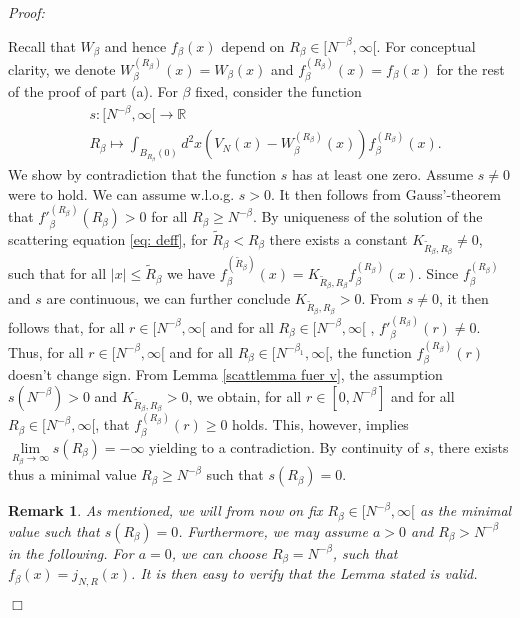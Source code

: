 \documentclass[11pt, english, american]{article}
\newtheorem{remark}[theorem]  {Remark}
\newenvironment{proof}{\emph{Proof:}}{\begin{flushright} $ \Box $ \end{flushright}}
\begin{document}
\begin{proof}
\begin{enumerate}
Recall that $W_{\beta}$ and hence $f_{\beta}(x) $ depend on $R_\beta
\in [N^{-\beta}, \infty[
$. 
 For conceptual clarity, we
 denote $W_{\beta}^{(R_{\beta})}(x) = W_{\beta}(x) $ and
$f_{\beta}^{(R_{\beta})}(x)= f_{\beta}(x)$ for the rest of the proof of part (a).
For $\beta$ fixed, consider the function
\begin{align}
& s: [N^{-\beta} ,\infty [ 
\rightarrow  \mathbb{R} \\
&R_{\beta}
\mapsto  
\int_{B_{R_{\beta}}(0)} d^2 x
 (V_N(x)-W^{(R_{\beta})}_{\beta}(x)) f^{(R_{\beta})}_{\beta} (x).
\end{align}
We show  by contradiction that the function $s$ has at least one zero.
Assume $s \neq 0$ were to hold.
 We can assume w.l.o.g. $s >0$. 
It  then
follows from Gauss'-theorem that 
$
f'^{(R_{\beta})}_{\beta}(R_{\beta})> 0
$ for all  
$R_\beta \geq N^{-\beta}$.
By uniqueness of the solution of the scattering equation \eqref{eq: deff}, for $\tilde{R}_{\beta}<R_{\beta}$ there exists a constant
$ K_{\tilde{R}_{\beta},R_{\beta}} \neq 0$, such that for all
$
|x|\leq \tilde{R}_{\beta}
$
we have
$
f^{(\tilde{R}_{\beta})}_{\beta}(x)= K_{\tilde{R}_{\beta},R_{{\beta}}}f^{(R_{\beta})}_{\beta}(x)
$. Since $ f^{(R_{\beta})}_{\beta} $ and $s$ are continuous, we can further conclude
 $ K_{\tilde{R}_{\beta},R_{{\beta}}}> 0$.
From $ s \neq 0$, it then follows that, for all $r \in [N^{-\beta} ,\infty [  $ and for all $R_\beta \in [N^{-\beta} ,\infty [ $ , $
f'^{(R_{\beta})}_{\beta}(r) \neq 0 $.
Thus, for all $r \in [N^{-\beta} ,\infty [  $ and for all $R_\beta \in [N^{-\beta_1} ,\infty [ $, the function
$f^{(R_{\beta})}_{\beta}(r)$ doesn't change sign. 
From Lemma \ref{scattlemma fuer v}, the assumption $s(N^{-\beta})>0$ and  $ K_{\tilde{R}_{\beta},R_{{\beta}}} > 0$, we obtain,
 for all $r \in [0, N^{-\beta} ] $ and for all $R_{\beta} \in [N^{-\beta} ,\infty [ $, that
$f^{(R_{\beta})}_{\beta} (r) \geq 0$ holds.
This, however, implies $\lim\limits_{R_{\beta} \rightarrow \infty} s(R_{\beta})= - \infty$ yielding to a contradiction.  
By continuity of $s$, there exists thus a minimal value $R_{\beta} \geq N^{-\beta} $ such that
$s(R_{\beta})=0$.

\begin{remark}
As mentioned, we will from now on fix $R_{\beta} \in [N^{- \beta}, \infty[$ as the minimal value such that $s(R_{\beta})=0$.
Furthermore, we may assume $a>0$ and $R_{\beta} >N^{-\beta}$ in the following. For $a=0$, we can choose $R_{\beta}=N^{-\beta}$, such that $f_{\beta}(x)=j_{N,R}(x)$. It is then easy to verify that the Lemma stated is valid.
\end{remark}



\end{enumerate}
\end{proof}
\end{document}
